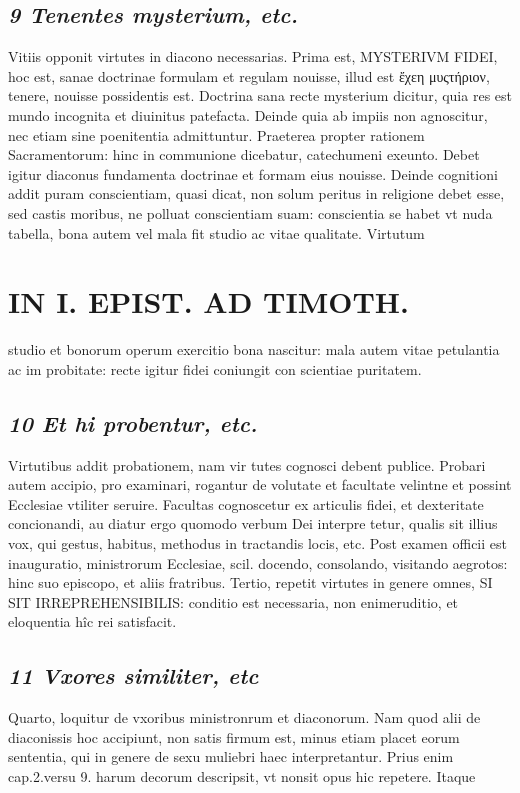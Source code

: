 \documentclass{article}
\begin{document}
\begin{pages}
\subsection*{\textit{9 Tenentes mysterium, etc. }}\pstart Vitiis opponit virtutes in diacono necessarias. Prima est, MYSTERIVM FIDEI, hoc est, sanae doctrinae formulam et regulam nouisse, illud est ἔχεη μυςτήριον, tenere, nouisse possidentis est. Doctrina sana recte mysterium dicitur, quia res est mundo incognita et diuinitus patefacta. Deinde quia ab impiis non agnoscitur, nec etiam sine poenitentia admittuntur. Praeterea propter rationem Sacramentorum: hinc in communione dicebatur, catechumeni exeunto. Debet igitur diaconus fundamenta doctrinae et formam eius nouisse. Deinde cognitioni addit puram conscientiam, quasi dicat, non solum peritus in religione debet esse, sed castis moribus, ne polluat conscientiam suam: conscientia se habet vt nuda tabella, bona autem vel mala fit studio ac vitae qualitate. Virtutum  \pend
\section*{IN I. EPIST. AD TIMOTH. }
\marginpar{[ p.73 ]}\pstart studio et bonorum operum exercitio bona nascitur: mala autem vitae petulantia ac im probitate: recte igitur fidei coniungit con scientiae puritatem.  \pend
{}
{}
\subsection*{\textit{10 Et hi probentur, etc. }}\pstart Virtutibus addit probationem, nam vir tutes cognosci debent publice. Probari autem accipio, pro examinari, rogantur de volutate et facultate velintne et possint Ecclesiae vtiliter seruire. Facultas cognoscetur ex articulis fidei, et dexteritate concionandi, au diatur ergo quomodo verbum Dei interpre tetur, qualis sit illius vox, qui gestus, habitus, methodus in tractandis locis, etc.  \pend\pstart Post examen officii est inauguratio, ministrorum Ecclesiae, scil. docendo, consolando, visitando aegrotos: hinc suo episcopo, et aliis fratribus. Tertio, repetit virtutes in genere omnes, SI SIT IRREPREHENSIBILIS: conditio est necessaria, non enimeruditio, et eloquentia hîc rei satisfacit.  \pend
{}
{}
\subsection*{\textit{11 Vxores similiter, etc }}\pstart Quarto, loquitur de vxoribus ministronrum et diaconorum. Nam quod alii de diaconissis hoc accipiunt, non satis firmum est, minus etiam placet eorum sententia, qui in genere de sexu muliebri haec interpretantur. Prius enim cap.2.versu 9. harum decorum descripsit, vt nonsit opus hic repetere. Itaque  \pend

\end{pages}
\end{document}
